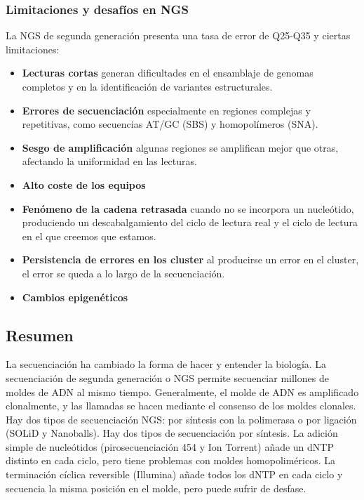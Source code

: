 \subsubsection{Limitaciones y desafíos en NGS}
La NGS de segunda generación presenta una tasa de error de Q25-Q35 y ciertas limitaciones:
\begin{itemize}
\item \textbf{Lecturas cortas} generan dificultades en el ensamblaje de genomas completos y en la identificación de variantes estructurales.
\item \textbf{Errores de secuenciación} especialmente en regiones complejas y repetitivas, como secuencias AT/GC (SBS) y homopolímeros (SNA).
\item \textbf{Sesgo de amplificación} algunas regiones se amplifican mejor que otras, afectando la uniformidad en las lecturas.
\item \textbf{Alto coste de los equipos}
\item \textbf{Fenómeno de la cadena retrasada} cuando no se incorpora un nucleótido, produciendo un descabalgamiento del ciclo de lectura real y el ciclo de lectura en el que creemos que estamos.
\item \textbf{Persistencia de errores en los cluster} al producirse un error en el cluster, el error se queda a lo largo de la secuenciación.
\item \textbf{Cambios epigenéticos}
\end{itemize}

\subsection{Resumen}
La secuenciación ha cambiado la forma de hacer y entender la biología. La secuenciación de segunda generación o NGS permite secuenciar millones de moldes de ADN al mismo tiempo. Generalmente, el molde de ADN es amplificado clonalmente, y las llamadas se hacen mediante el consenso de los moldes clonales. Hay dos tipos de secuenciación NGS: por síntesis con la polimerasa o por ligación (SOLiD y Nanoballs). Hay dos tipos de secuenciación por síntesis. La adición simple de nucleótidos (pirosecuenciación 454 y Ion Torrent) añade un dNTP distinto en cada ciclo, pero tiene problemas con moldes homopoliméricos. La terminación cíclica reversible (Illumina) añade todos los dNTP en cada ciclo y secuencia la misma posición en el molde, pero puede sufrir de desfase.

